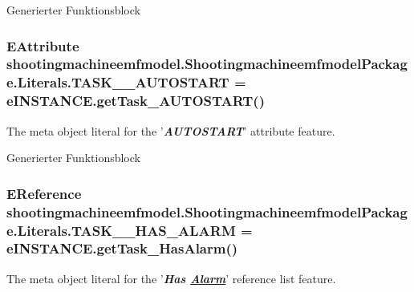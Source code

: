 Generierter Funktionsblock \hypertarget{interfaceshootingmachineemfmodel_1_1_shootingmachineemfmodel_package_1_1_literals_afd79e5d39bbbc1e8abfc2a8972ffb89f}{
\subsubsection[{T\-A\-S\-K\-\_\-\-\_\-\-A\-U\-T\-O\-S\-T\-A\-R\-T}]{\setlength{\rightskip}{0pt plus 5cm}E\-Attribute shootingmachineemfmodel.\-Shootingmachineemfmodel\-Package.\-Literals.\-T\-A\-S\-K\-\_\-\-\_\-\-A\-U\-T\-O\-S\-T\-A\-R\-T = e\-I\-N\-S\-T\-A\-N\-C\-E.\-get\-Task\-\_\-\-A\-U\-T\-O\-S\-T\-A\-R\-T()}}\label{interfaceshootingmachineemfmodel_1_1_shootingmachineemfmodel_package_1_1_literals_afd79e5d39bbbc1e8abfc2a8972ffb89f}
The meta object literal for the '{\itshape {\bfseries A\-U\-T\-O\-S\-T\-A\-R\-T}}' attribute feature.

Generierter Funktionsblock \hypertarget{interfaceshootingmachineemfmodel_1_1_shootingmachineemfmodel_package_1_1_literals_a765d7ba7a3095109fbd494db4df0967e}{
\subsubsection[{T\-A\-S\-K\-\_\-\-\_\-\-H\-A\-S\-\_\-\-A\-L\-A\-R\-M}]{\setlength{\rightskip}{0pt plus 5cm}E\-Reference shootingmachineemfmodel.\-Shootingmachineemfmodel\-Package.\-Literals.\-T\-A\-S\-K\-\_\-\-\_\-\-H\-A\-S\-\_\-\-A\-L\-A\-R\-M = e\-I\-N\-S\-T\-A\-N\-C\-E.\-get\-Task\-\_\-\-Has\-Alarm()}}\label{interfaceshootingmachineemfmodel_1_1_shootingmachineemfmodel_package_1_1_literals_a765d7ba7a3095109fbd494db4df0967e}
The meta object literal for the '{\itshape {\bfseries Has \hyperlink{interfaceshootingmachineemfmodel_1_1_alarm}{Alarm}}}' reference list feature.

